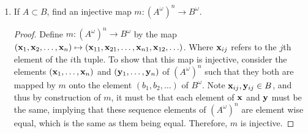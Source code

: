 \documentclass[12pt]{article}
\begin{document}
\begin{enumerate}[label=(\alph*)]
\begin{proof}
			To show $k$ is injective, consider two elements in $X^\omega \times X^\omega$,
			say $x, y$,
			such that they are both mapped to the same element of $X^\omega$, $z$.
			This would imply that the elements in the first tuple of $x$ and $y$ are 
			the odd elements in $z$, and the elements of the second tuple of $x$ and $y$
			are the even elements of $z$. As such, element wise each tuple of $x$ and $y$
			are equal, which implies $x$ and $y$ must be the same element of $X^\omega \times X^\omega$
			since they are element wise the same. As such, $l$ is also injective, and thus
			we conclude $l$ is bijective.
		\end{proof}
		\item If $A \subset B$, find an injective map $m: (A^\omega)^n \to B^{\omega}$.
		\begin{proof}
			Define $m: (A^\omega)^n \to B^\omega$ by the map
			$(\mathbf{x}_1, \mathbf{x}_2, \ldots, \mathbf{x}_n) \mapsto (\mathbf{x}_{11}, \mathbf{x}_{21}, \ldots, \mathbf{x}_{n1}, \mathbf{x}_{12}, \ldots)$.
			Where $\mathbf{x}_{ij}$ refers to the $j$th element of the $i$th tuple. 
			To show that this map is injective, consider the elements 
			$(\mathbf{x}_1, \ldots, \mathbf{x}_n)$ and $(\mathbf{y}_1, \ldots, \mathbf{y}_n)$ of $(A^\omega)^n$ such that 
			they both are mapped by $m$ onto the element 
			$(b_1, b_2, \ldots)$ of $B^\omega$. Note 
			$\mathbf{x}_{ij}, \mathbf{y}_{ij} \in B$, and thus by construction of $m$, it must be 
			that each element of $\mathbf{x}$ and $\mathbf{y}$ must be the same, implying that these sequence
			elements of $(A^\omega)^n$ are element wise equal, which is the same as them
			being equal. Therefore, $m$ is injective.  
		\end{proof}
	\end{enumerate}
	
\end{document}
